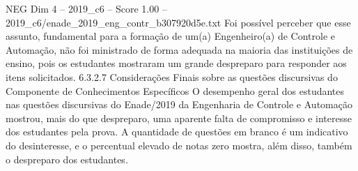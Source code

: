 \begin{textsample}{NEG Dim 4 – 2019\_c6 – Score 1.00 – 2019\_c6/enade\_2019\_eng\_contr\_b307920d5e.txt}
Foi possível perceber que esse assunto, fundamental para a formação de um(a) Engenheiro(a) de Controle e Automação, não foi ministrado de forma adequada na maioria das instituições de ensino, pois os estudantes mostraram um grande despreparo para responder aos itens solicitados. 6.3.2.7 Considerações Finais sobre as questões discursivas do Componente de Conhecimentos Específicos O desempenho geral dos estudantes nas questões discursivas do Enade/2019 da Engenharia de Controle e Automação mostrou, mais do que despreparo, uma aparente falta de compromisso e interesse dos estudantes pela prova.
A quantidade de questões em branco é um indicativo do desinteresse, e o percentual elevado de notas zero mostra, além disso, também o despreparo dos estudantes.

\end{textsample}

